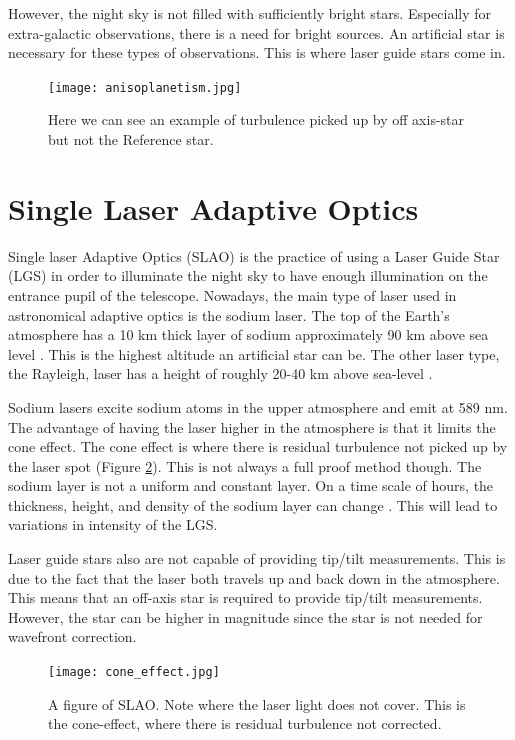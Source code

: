 However, the night sky is not filled with sufficiently bright stars.  Especially for
extra-galactic observations, there is a need for bright sources.  An
artificial star is necessary for these types of observations.  This is where laser
guide stars come in.

\begin{figure}[h!]
\centering
\texttt{[image: anisoplanetism.jpg]}
\caption{Here we can see an example of turbulence picked up by off axis-star but not the Reference star\cite{aomode}.}
\label{fig:ani}
\end{figure}




\section{Single Laser Adaptive Optics}

Single laser Adaptive Optics (SLAO) is the practice of using a Laser Guide Star
(LGS) in order to illuminate the night sky to have enough illumination on the
entrance pupil of the telescope.  Nowadays, the main type of laser used in astronomical
adaptive optics is the sodium laser.  The top of the Earth's atmosphere has a 10 km
thick layer of sodium approximately 90 km above sea level \cite{sodium}.  This is
the highest altitude an artificial star can be.  The other laser type, the Rayleigh,
laser has a height of roughly 20-40 km above sea-level \cite{Rayleigh}.  %

Sodium lasers excite sodium atoms in the upper atmosphere and emit at 589 nm.  The
advantage of having the laser higher in the atmosphere is that it limits the cone
effect.  The cone effect is where there is residual turbulence not picked up by the
laser spot (Figure \ref{fig:cone}).  This is not always a full proof method though.
The sodium layer is not a uniform and constant layer.  On a time scale of hours, the
thickness, height, and density of the sodium layer can change \cite{sodium}.  This
will lead to variations in intensity of the LGS.

Laser guide stars also are not capable of providing tip/tilt measurements.  This is
due to the fact that the laser both travels up and back down in the atmosphere.  
This means that an off-axis star is required to provide tip/tilt measurements. 
However, the star can be higher in magnitude since the star is not needed for
wavefront correction.

\begin{figure}[h!]
\centering
\texttt{[image: cone\_effect.jpg]}
\caption{A figure of SLAO.  Note where the laser light does not cover.  This is the cone-effect, where there is residual turbulence not corrected\cite{aomode}.}
\label{fig:cone}
\end{figure}

